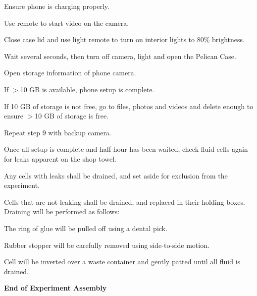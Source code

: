 \begin{checklist}
    \begin{checklist}
        \item Ensure phone is charging properly.
        \item Use remote to start video on the camera.
        \item Close case lid and use light remote to turn on interior lights to 80\% brightness. 
        \item Wait several seconds, then turn off camera, light and open the Pelican Case. 
    \end{checklist}
    \item Open storage information of phone camera.
    \begin{checklist}
        \item If $>$10 GB is available, phone setup is complete.
        \item If 10 GB of storage is not free, go to files, photos and videos and delete enough to ensure $>$10 GB of storage is free.
        \item Repeat step 9 with backup camera.
    \end{checklist}
    \item Once all setup is complete and half-hour has been waited, check fluid cells again for leaks apparent on the shop towel.
    \begin{checklist}
        \item Any cells with leaks shall be drained, and set aside for exclusion from the experiment.
        \item Cells that are not leaking shall be drained, and replaced in their holding boxes. Draining will be performed as follows:
        \begin{checklist}
            \item The ring of glue will be pulled off using a dental pick.
            \item Rubber stopper will be carefully removed using side-to-side motion.
            \item Cell will be inverted over a waste container and gently patted until all fluid is drained.
        \end{checklist}
    \end{checklist}
\end{checklist}
\textbf{End of Experiment Assembly}

\newpage{}
